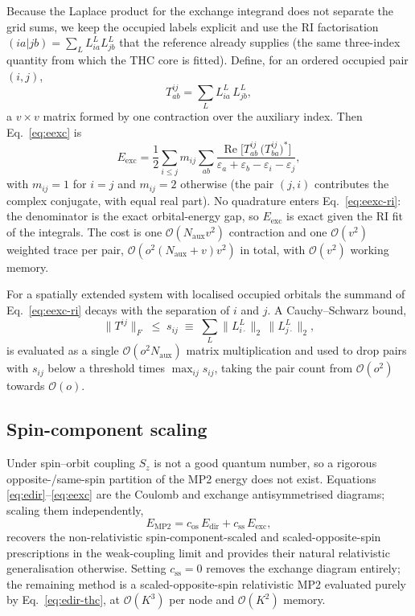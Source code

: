 \documentclass[aip,jcp,amsmath,amssymb,preprint,superscriptaddress]{revtex4-2}%
\newcommand{\Edir}{E_{\mathrm{dir}}}
\newcommand{\Eexc}{E_{\mathrm{exc}}}
\newcommand{\Emp}{E_{\mathrm{MP2}}}
\newcommand{\Naux}{N_{\mathrm{aux}}}
\newcommand{\re}{\operatorname{Re}}
\newcommand{\Ord}[1]{\mathcal{O}\!\left(#1\right)}
\begin{document}
Because the Laplace product for the exchange integrand does not separate the
grid sums, we keep the occupied labels explicit and use the RI factorisation
$(ia|jb)=\sum_L L^{L}_{ia}L^{L}_{jb}$ that the reference already supplies
(the same three-index quantity from which the THC core is fitted). Define,
for an ordered occupied pair $(i,j)$,
\begin{equation}
  T^{ij}_{ab} = \sum_{L} L^{L}_{ia}\,L^{L}_{jb},
  \label{eq:Tij}
\end{equation}
a $v\times v$ matrix formed by one contraction over the auxiliary index.
Then Eq.~\eqref{eq:eexc} is
\begin{equation}
  \Eexc = \frac12 \sum_{i\le j} m_{ij}
          \sum_{ab}
          \frac{\re\!\bigl[T^{ij}_{ab}\,\bigl(T^{ij}_{ba}\bigr)^{*}\bigr]}
               {\varepsilon_a+\varepsilon_b-\varepsilon_i-\varepsilon_j},
  \label{eq:eexc-ri}
\end{equation}
with $m_{ij}=1$ for $i=j$ and $m_{ij}=2$ otherwise (the pair $(j,i)$
contributes the complex conjugate, with equal real part). No quadrature
enters Eq.~\eqref{eq:eexc-ri}: the denominator is the exact orbital-energy
gap, so $\Eexc$ is exact given the RI fit of the integrals. The cost is one
$\Ord{\Naux v^2}$ contraction and one $\Ord{v^2}$ weighted trace per pair,
$\Ord{o^2(\Naux+v)v^2}$ in total, with $\Ord{v^2}$ working memory.

For a spatially extended system with localised occupied
orbitals\cite{Pulay1983,Saebo1993} the summand of Eq.~\eqref{eq:eexc-ri}
decays with the separation of $i$ and $j$. A Cauchy--Schwarz bound,
\begin{equation}
  \bigl\|T^{ij}\bigr\|_{F}
   \;\le\; s_{ij}
   \;\equiv\; \sum_{L}\bigl\|L^{L}_{i\cdot}\bigr\|_{2}\,
                     \bigl\|L^{L}_{j\cdot}\bigr\|_{2},
  \label{eq:schwarz}
\end{equation}
is evaluated as a single $\Ord{o^2\Naux}$ matrix multiplication and used to
drop pairs with $s_{ij}$ below a threshold times $\max_{ij}s_{ij}$, taking
the pair count from $\Ord{o^2}$ towards $\Ord{o}$.

\subsection{Spin-component scaling}

Under spin--orbit coupling $S_z$ is not a good quantum number, so a
rigorous opposite-/same-spin partition of the MP2 energy does not exist.
Equations \eqref{eq:edir}--\eqref{eq:eexc} are the Coulomb and exchange
antisymmetrised diagrams; scaling them independently,
\begin{equation}
  \Emp = c_{\mathrm{os}}\,\Edir + c_{\mathrm{ss}}\,\Eexc,
  \label{eq:scs}
\end{equation}
recovers the non-relativistic spin-component-scaled\cite{Grimme2003} and
scaled-opposite-spin\cite{Jung2004} prescriptions in the weak-coupling
limit and provides their natural relativistic generalisation otherwise.
Setting $c_{\mathrm{ss}}=0$ removes the exchange diagram entirely; the
remaining method is a scaled-opposite-spin relativistic MP2 evaluated
purely by Eq.~\eqref{eq:edir-thc}, at $\Ord{K^3}$ per node and $\Ord{K^2}$
memory.
\end{document}
